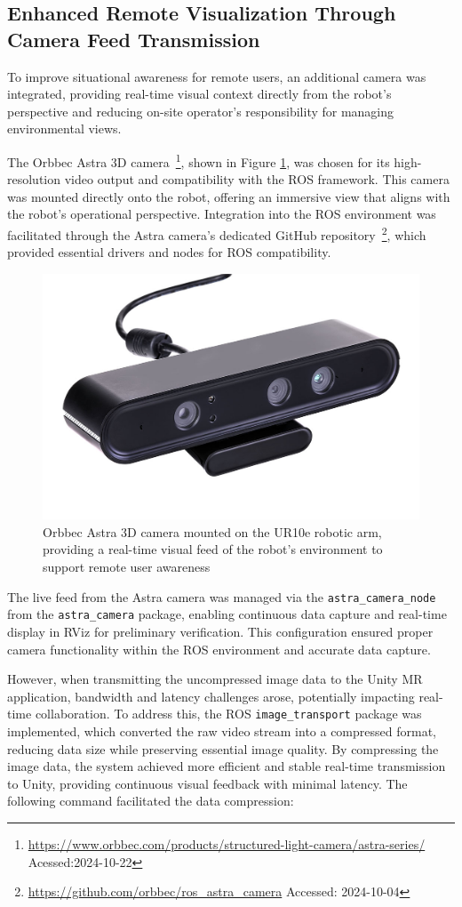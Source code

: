 \subsection{Enhanced Remote Visualization Through Camera Feed Transmission}

To improve situational awareness for remote users, an additional camera was integrated, providing real-time visual context directly from the robot’s perspective and reducing on-site operator's responsibility for managing environmental views.

The Orbbec Astra 3D camera~\footnote{\url{https://www.orbbec.com/products/structured-light-camera/astra-series/} Acessed:2024-10-22}, shown in Figure \ref{fig:astra-camera}, was chosen for its high-resolution video output and compatibility with the \ac{ROS} framework. This camera was mounted directly onto the robot, offering an immersive view that aligns with the robot’s operational perspective. Integration into the \ac{ROS} environment was facilitated through the Astra camera’s dedicated GitHub repository~\footnote{\url{https://github.com/orbbec/ros\_astra\_camera} Accessed: 2024-10-04}, which provided essential drivers and nodes for \ac{ROS} compatibility.

\begin{figure}[h]
    \centering
    \includegraphics[width=0.5\linewidth]{figs/AstraSeries_3.jpg}
    \caption{Orbbec Astra 3D camera mounted on the UR10e robotic arm, providing a real-time visual feed of the robot's environment to support remote user awareness}
    \label{fig:astra-camera}
\end{figure}

The live feed from the Astra camera was managed via the \texttt{astra\_camera\_node} from the \texttt{astra\_camera} package, enabling continuous data capture and real-time display in RViz for preliminary verification. This configuration ensured proper camera functionality within the \ac{ROS} environment and accurate data capture. 

However, when transmitting the uncompressed image data to the Unity \ac{MR} application, bandwidth and latency challenges arose, potentially impacting real-time collaboration. To address this, the \ac{ROS} \texttt{image\_transport} package was implemented, which converted the raw video stream into a compressed format, reducing data size while preserving essential image quality. By compressing the image data, the system achieved more efficient and stable real-time transmission to Unity, providing continuous visual feedback with minimal latency. The following command facilitated the data compression:


